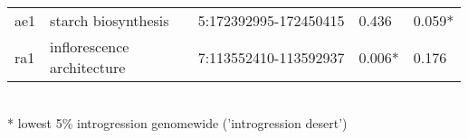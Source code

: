 \begin{sidewaystable}[p]
\begin{tabular}{llllll}
  ae1 & starch biosynthesis & \cite{Whitt:2002_starch} & 5:172392995-172450415 & 0.436 & 0.059* \\ 
  ra1 & \makecell[tl]{inflorescence\\ architecture} & \cite{Vollbrecht:2005_ramosa, Sigmon_Vollbrecht:2010} & 7:113552410-113592937 & 0.006* & 0.176 \\ 
   \hline
\end{tabular}
\\
 * lowest 5\% introgression genomewide ('introgression desert')
\end{sidewaystable}
